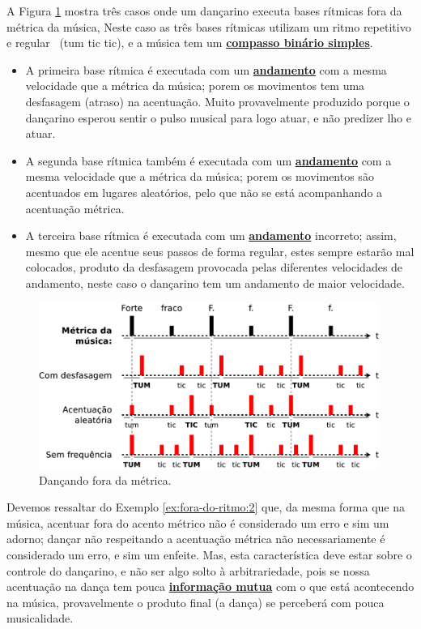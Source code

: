 \begin{example}
\label{ex:fora-do-ritmo:2}
A Figura \ref{fig:fora-do-ritmo-sem} mostra três casos 
onde um dançarino executa bases rítmicas fora da métrica da música,
Neste caso as três bases rítmicas utilizam um ritmo repetitivo e regular \Vier \Acht \Acht~(tum tic tic),
e a música  tem um \hyperref[subsec:compassobinario]{\textbf{compasso binário simples}}.
\begin{itemize}
\item A primeira base rítmica é executada com um \hyperref[sec:Andamento]{\textbf{andamento}} com
a mesma velocidade que a métrica da música; 
porem os movimentos tem uma desfasagem (atraso) na acentuação. 
Muito provavelmente produzido porque o dançarino esperou sentir o pulso musical para logo atuar,
e não predizer lho e atuar. 
\item A segunda base rítmica também é executada com um \hyperref[sec:Andamento]{\textbf{andamento}} com
a mesma velocidade que a métrica da música; 
porem os movimentos são acentuados em lugares aleatórios, 
pelo que não se está acompanhando a acentuação métrica.
\item A terceira base rítmica é executada com um \hyperref[sec:Andamento]{\textbf{andamento}} incorreto;
assim, mesmo que ele acentue seus passos de forma regular, estes sempre estarão mal colocados,
produto da desfasagem provocada pelas diferentes velocidades de andamento,
neste caso o dançarino tem um andamento de maior velocidade.
\end{itemize}
\end{example}
\begin{figure}[!h]
    \centering 
    \includegraphics[width=0.99\textwidth]{chapters/cap-musicalidade/fora-do-ritmo-sem.eps}
    \caption{Dançando fora da métrica.}
    \label{fig:fora-do-ritmo-sem}
\end{figure}

Devemos ressaltar do Exemplo \ref{ex:fora-do-ritmo:2} que,
da mesma forma que na música, acentuar fora do acento métrico não é considerado um erro e sim um adorno; 
dançar não respeitando a acentuação métrica não necessariamente é considerado um erro,
e sim um enfeite. Mas, esta característica deve estar sobre o controle do dançarino,
e não ser algo solto à arbitrariedade, 
pois se nossa acentuação na dança tem pouca 
\hyperref[sec:musicalidadeinfmutua]{\textbf{informação mutua}} com o que está acontecendo na música, 
provavelmente o produto final (a dança) se perceberá com pouca musicalidade.  

